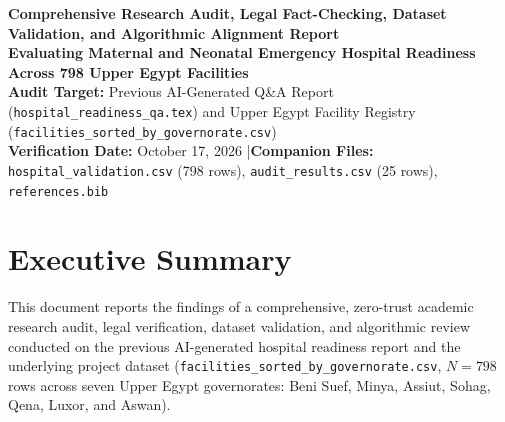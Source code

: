 \documentclass[10pt,a4paper]{article}
\begin{document}
\begin{center}
    {\LARGE\bfseries\color{primaryblue} Comprehensive Research Audit, Legal Fact-Checking, Dataset Validation, and Algorithmic Alignment Report}\\[0.4em]
    {\large\bfseries\color{secondaryteal} Evaluating Maternal and Neonatal Emergency Hospital Readiness Across 798 Upper Egypt Facilities}\\[0.5em]
    {\small\color{darkgray} \textbf{Audit Target:} Previous AI-Generated Q\&A Report (\texttt{hospital\_readiness\_qa.tex}) and Upper Egypt Facility Registry (\texttt{facilities\_sorted\_by\_governorate.csv})}\\
    {\small\color{darkgray} \textbf{Verification Date:} October 17, 2026 \quad|\quad \textbf{Companion Files:} \texttt{hospital\_validation.csv} (798 rows), \texttt{audit\_results.csv} (25 rows), \texttt{references.bib}}
\end{center}
\vspace{0.2cm}

\section{Executive Summary}

This document reports the findings of a comprehensive, zero-trust academic research audit, legal verification, dataset validation, and algorithmic review conducted on the previous AI-generated hospital readiness report and the underlying project dataset (\texttt{facilities\_sorted\_by\_governorate.csv}, $N = 798$ rows across seven Upper Egypt governorates: Beni Suef, Minya, Assiut, Sohag, Qena, Luxor, and Aswan).
\end{document}
